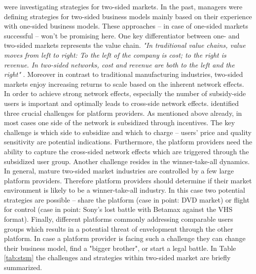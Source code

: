 \citet{Eisenmann2006} were investigating strategies for two-sided markets. In the past, managers were defining strategies for two-sided business models mainly based on their experience with one-sided business models. These approaches -- in case of one-sided markets successful -- won't be promising here. One key differentiator between one- and two-sided markets represents the value chain. \textit{"In traditional value chains, value moves from left to right: To the left of the company is cost; to the right is revenue. In two-sided networks, cost and revenue are both to the left and the right"} \citep[p. 94]{Eisenmann2006}. Moreover in contrast to traditional manufacturing industries, two-sided markets enjoy increasing returns to scale based on the inherent network effects. In order to achieve strong network effects, especially the number of subsidy-side users is important and optimally leads to cross-side network effects. \citet{Eisenmann2006} identified three crucial challenges for platform providers. As mentioned above already, in most cases one side of the network is subsidized through incentives. The key challenge is which side to subsidize and which to charge -- users' price and quality sensitivity are potential indications. Furthermore, the platform providers need the ability to capture the cross-sided network effects which are triggered through the subsidized user group. Another challenge resides in the winner-take-all dynamics. In general, mature two-sided market industries are controlled by a few large platform providers. Therefore platform providers should determine if their market environment is likely to be a winner-take-all industry. In this case two potential strategies are possible -- share the platform (case in point: \ac{DVD} market) or flight for control (case in point: Sony's lost battle with Betamax against the \ac{VHS} format). Finally, different platforms commonly addressing comparable users groups which results in a potential threat of envelopment through the other platform. In case a platform provider is facing such a challenge they can change their business model, find a "bigger brother", or start a legal battle. In Table \ref{tab:stsm} the challenges and strategies within two-sided market are briefly summarized.

